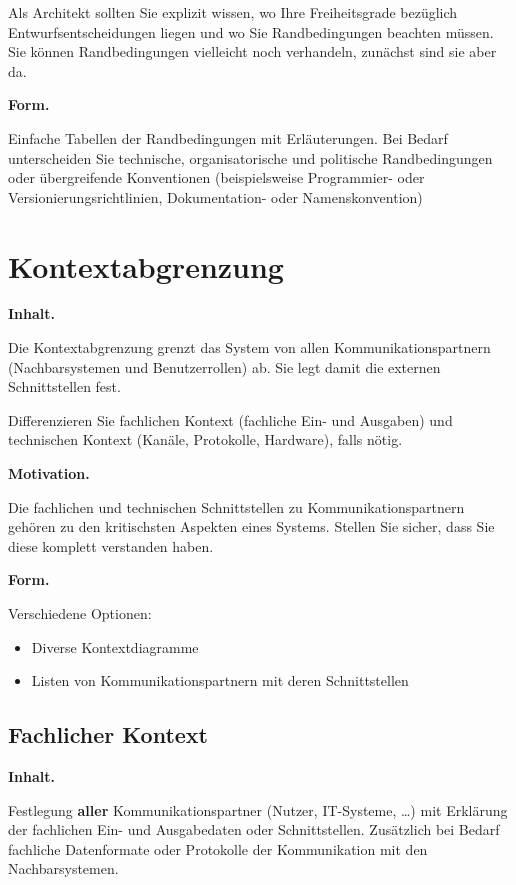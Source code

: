 \documentclass[]{article}
\begin{document}
Als Architekt sollten Sie explizit wissen, wo Ihre Freiheitsgrade
bezüglich Entwurfsentscheidungen liegen und wo Sie Randbedingungen
beachten müssen. Sie können Randbedingungen vielleicht noch verhandeln,
zunächst sind sie aber da.

\textbf{Form.}

Einfache Tabellen der Randbedingungen mit Erläuterungen. Bei Bedarf
unterscheiden Sie technische, organisatorische und politische
Randbedingungen oder übergreifende Konventionen (beispielsweise
Programmier- oder Versionierungsrichtlinien, Dokumentation- oder
Namenskonvention)

\section{Kontextabgrenzung}\label{section-system-scope-and-context}

\textbf{Inhalt.}

Die Kontextabgrenzung grenzt das System von allen Kommunikationspartnern
(Nachbarsystemen und Benutzerrollen) ab. Sie legt damit die externen
Schnittstellen fest.

Differenzieren Sie fachlichen Kontext (fachliche Ein- und Ausgaben) und
technischen Kontext (Kanäle, Protokolle, Hardware), falls nötig.

\textbf{Motivation.}

Die fachlichen und technischen Schnittstellen zu Kommunikationspartnern
gehören zu den kritischsten Aspekten eines Systems. Stellen Sie sicher,
dass Sie diese komplett verstanden haben.

\textbf{Form.}

Verschiedene Optionen:

\begin{itemize}
\item
  Diverse Kontextdiagramme
\item
  Listen von Kommunikationspartnern mit deren Schnittstellen
\end{itemize}

\subsection{Fachlicher Kontext}\label{_fachlicher_kontext}

\textbf{Inhalt.}

Festlegung \textbf{aller} Kommunikationspartner (Nutzer, IT-Systeme,
\ldots{}) mit Erklärung der fachlichen Ein- und Ausgabedaten oder
Schnittstellen. Zusätzlich bei Bedarf fachliche Datenformate oder
Protokolle der Kommunikation mit den Nachbarsystemen.
\end{document}
